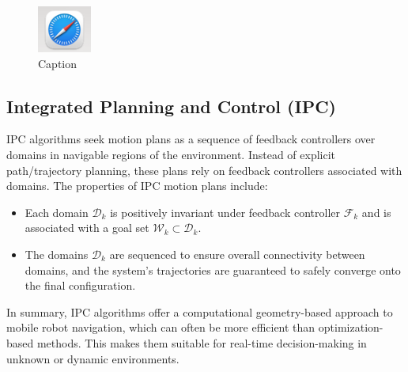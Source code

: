 \documentclass{article}
\begin{document}
    \begin{figure}[H]
        \centering
        \includegraphics[scale=0.5]{media/turtlebot3_burger_components.png}
        \caption{Caption}
        \label{fig:enter-label}
    \end{figure}
    
    \subsection{Integrated Planning and Control (IPC)}
    IPC algorithms seek motion plans as a sequence of feedback controllers over domains in navigable regions of the environment. Instead of explicit path/trajectory planning, these plans rely on feedback controllers associated with domains. The properties of IPC motion plans include:
    \begin{itemize}
        \item Each domain $\mathcal{D}_k$ is positively invariant under feedback controller $\mathcal{F}_k$ and is associated with a goal set $\mathcal{W}_k \subset \mathcal{D}_k$.
        \item The domains $\mathcal{D}_k$ are sequenced to ensure overall connectivity between domains, and the system's trajectories are guaranteed to safely converge onto the final configuration.
    
    \end{itemize}
    
    In summary, IPC algorithms offer a computational geometry-based approach to mobile robot navigation, which can often be more efficient than optimization-based methods. This makes them suitable for real-time decision-making in unknown or dynamic environments.
    
    
\end{document}
